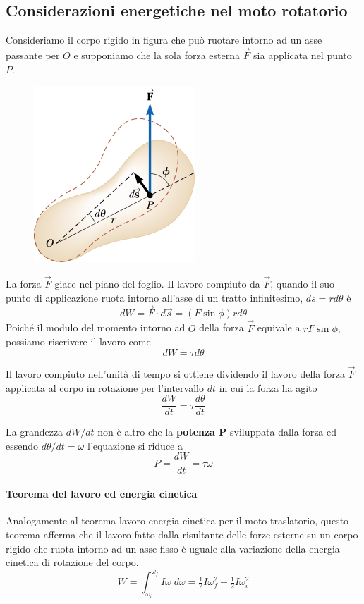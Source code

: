 \documentclass[a4paper,11pt,oneside]{book}
\begin{document}
\subsection{Considerazioni energetiche nel moto rotatorio}
Consideriamo il corpo rigido in figura che può ruotare intorno ad un asse passante per $O$ e supponiamo che la sola forza esterna $\vec{F}$ 
sia applicata nel punto $P$. 
\begin{figure}[h]
    \includegraphics[scale=0.4]{lavoro_corpo_rotazione.png}
    \centering
\end{figure}
La forza $\vec{F}$ giace nel piano del foglio. Il lavoro compiuto da $\vec{F}$, quando il suo punto 
di applicazione ruota intorno all’asse di un tratto infinitesimo, $ds = r d \theta$ è
\begin{equation*}
    dW = \vec{F} \cdot d\vec{s} = (F \sin{\phi})r d\theta 
\end{equation*}
Poiché il modulo del momento intorno ad $O$ della forza $\vec{F}$ equivale a $rF \sin{\phi}$, possiamo riscrivere il lavoro come
\begin{equation*}
    dW = \tau d\theta
\end{equation*}

Il lavoro compiuto nell’unità di tempo si ottiene dividendo il lavoro della forza $\vec{F}$ applicata al corpo in rotazione 
per l’intervallo $dt$ in cui la forza ha agito
\begin{equation*}
    \frac{dW}{dt} = \tau \frac{d\theta}{dt}
\end{equation*}

La grandezza $dW/dt$ non è altro che la \textbf{potenza P} sviluppata dalla forza ed essendo $d\theta / dt = \omega$ l'equazione si riduce a
\begin{equation*}
    P = \frac{dW}{dt} = \tau \omega
\end{equation*}

\paragraph{Teorema del lavoro ed energia cinetica}
Analogamente al teorema lavoro-energia cinetica per il moto traslatorio, questo teorema 
afferma che il lavoro fatto dalla risultante delle forze esterne su un corpo rigido che ruota intorno ad 
un asse fisso è uguale alla variazione della energia cinetica di rotazione del corpo.
\begin{equation*}
    W = \int_{\omega_i}^{\omega_f} I\omega \; d\omega = \tfrac{1}{2} I\omega_f^2 - \tfrac{1}{2}I\omega_i^2
\end{equation*}
\end{document}
